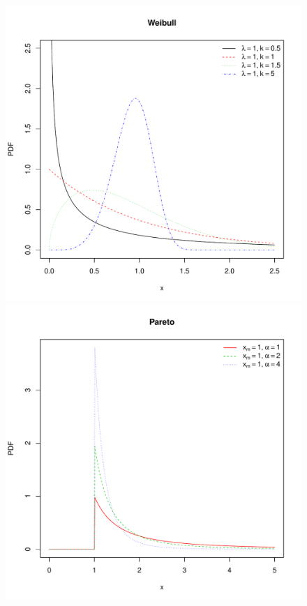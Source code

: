\documentclass[landscape]{article}
\begin{document}
\begin{figure}[H]
  \includegraphics[scale=0.35]{figs/weibull.pdf}
  \includegraphics[scale=0.35]{figs/pareto.pdf}
\end{figure}
\end{document}
